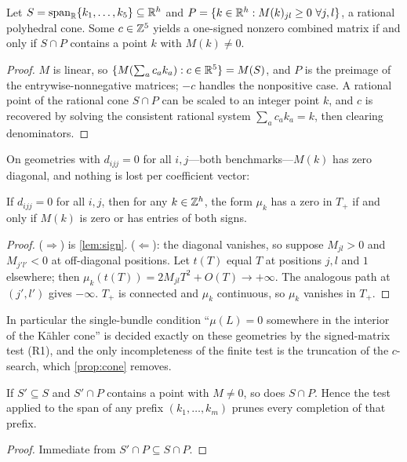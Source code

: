 \begin{proposition}\label{prop:cone}
Let $S=\operatorname{span}_{\mathbb{R}}\{k_1,\dots,k_5\}\subseteq\mathbb{R}^h$ and
$P=\{k\in\mathbb{R}^h: M(k)_{jl}\ge0\ \forall j,l\}$, a rational polyhedral cone. Some
$c\in\mathbb{Z}^5$ yields a one-signed nonzero combined matrix if and only if $S\cap P$
contains a point $k$ with $M(k)\neq0$.
\end{proposition}
\begin{proof}
$M$ is linear, so $\{M(\sum_ac_ak_a):c\in\mathbb{R}^5\}=M(S)$, and $P$ is the preimage of
the entrywise-nonnegative matrices; $-c$ handles the nonpositive case. A
rational point of the rational cone $S\cap P$ can be scaled to an integer point
$k$, and $c$ is recovered by solving the consistent rational system
$\sum_ac_ak_a=k$, then clearing denominators.
\end{proof}

On geometries with $d_{ijj}=0$ for all $i,j$---both benchmarks---$M(k)$ has zero
diagonal, and nothing is lost per coefficient vector:

\begin{proposition}\label{prop:percoef}
If $d_{ijj}=0$ for all $i,j$, then for any $k\in\mathbb{Z}^h$, the form $\mu_k$ has a
zero in $T_+$ if and only if $M(k)$ is zero or has entries of both signs.
\end{proposition}
\begin{proof}
($\Rightarrow$) is \cref{lem:sign}. ($\Leftarrow$): the diagonal vanishes, so
suppose $M_{jl}>0$ and $M_{j'l'}<0$ at off-diagonal positions. Let $t(T)$ equal
$T$ at positions $j,l$ and $1$ elsewhere; then
$\mu_k(t(T))=2M_{jl}T^2+O(T)\to+\infty$. The analogous path at $(j',l')$ gives
$-\infty$. $T_+$ is connected and $\mu_k$ continuous, so $\mu_k$ vanishes in $T_+$.
\end{proof}

In particular the single-bundle condition ``$\mu(L)=0$ somewhere in the
interior of the Kähler cone'' is decided exactly on these geometries by the
signed-matrix test (R1), and the only incompleteness of the finite test is the
truncation of the $c$-search, which \cref{prop:cone} removes.

\begin{proposition}[Monotonicity]\label{prop:monotone}
If $S'\subseteq S$ and $S'\cap P$ contains a point with $M\ne0$, so does $S\cap P$.
Hence the test applied to the span of any prefix $(k_1,\dots,k_m)$ prunes every
completion of that prefix.
\end{proposition}
\begin{proof}
Immediate from $S'\cap P\subseteq S\cap P$.
\end{proof}


